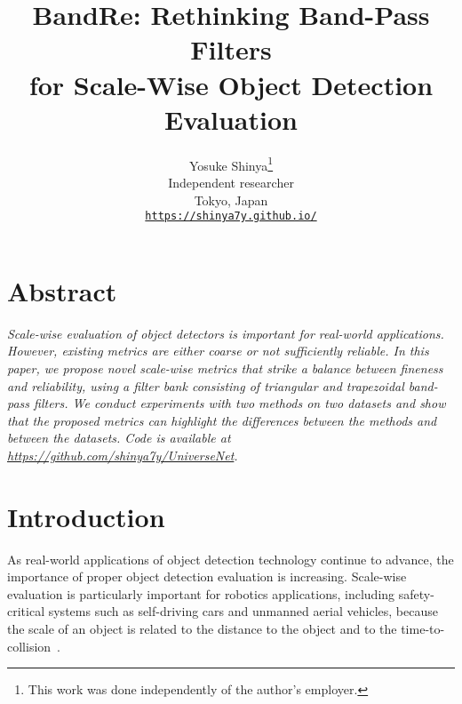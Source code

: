 \documentclass{mva_style}
\begin{document}
\title{BandRe: Rethinking Band-Pass Filters\\for Scale-Wise Object Detection Evaluation}

\author{
Yosuke Shinya\thanks{This work was done independently of the author's employer.}\\
Independent researcher\\
Tokyo, Japan\\
{\tt \url{https://shinya7y.github.io/}}\\
}

\maketitle



\section*{\centering Abstract}
\textit{
	Scale-wise evaluation of object detectors is important for real-world applications.
	However, existing metrics are either coarse or not sufficiently reliable.
	In this paper, we propose novel scale-wise metrics that strike a balance between fineness and reliability,
	using a filter bank consisting of triangular and trapezoidal band-pass filters.
	We conduct experiments with two methods on two datasets and show that the proposed metrics can highlight the differences between the methods and between the datasets.
	Code is available at \url{https://github.com/shinya7y/UniverseNet}.
}



\section{Introduction}
\label{sec:intro}




As real-world applications of object detection technology continue to advance, the importance of proper object detection evaluation is increasing.
Scale-wise evaluation is particularly important for robotics applications, including safety-critical systems such as self-driving cars and unmanned aerial vehicles,
because the scale of an object is related to the distance to the object and to the time-to-collision~\cite{Caltech_PAMI2012}.
\end{document}
